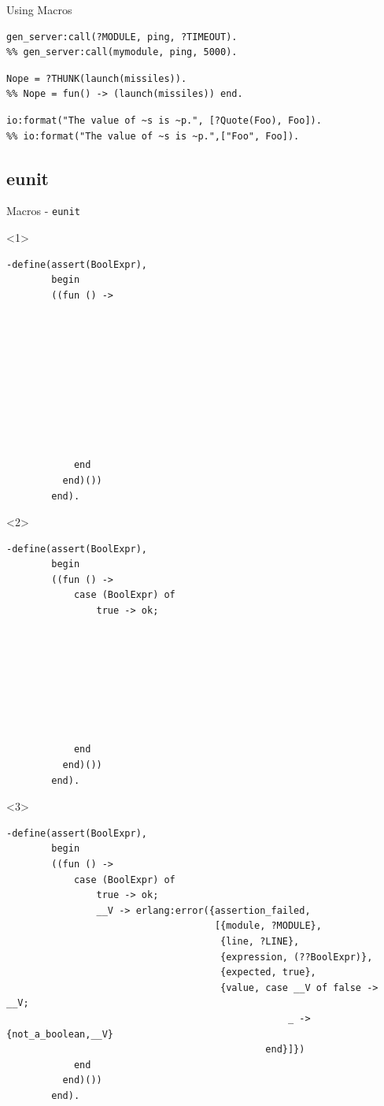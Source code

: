 \documentclass[c]{beamer}
\begin{document}
\begin{frame}[fragile]{Using Macros}
  \begin{lstlisting}
gen_server:call(?MODULE, ping, ?TIMEOUT).
%% gen_server:call(mymodule, ping, 5000).
  \end{lstlisting}
  \pause
  \begin{lstlisting}
Nope = ?THUNK(launch(missiles)).
%% Nope = fun() -> (launch(missiles)) end.
  \end{lstlisting}
  \pause
  \begin{lstlisting}
io:format("The value of ~s is ~p.", [?Quote(Foo), Foo]).
%% io:format("The value of ~s is ~p.",["Foo", Foo]).
  \end{lstlisting}
\end{frame}

\subsection{eunit}
\begin{frame}[fragile,t]{Macros - \texttt{eunit}}

  \begin{onlyenv}<1>
  \begin{lstlisting}
-define(assert(BoolExpr),
        begin
        ((fun () ->










            end
          end)())
        end).
  \end{lstlisting}
  \end{onlyenv}


  \begin{onlyenv}<2>
  \begin{lstlisting}
-define(assert(BoolExpr),
        begin
        ((fun () ->
            case (BoolExpr) of
                true -> ok;








            end
          end)())
        end).
  \end{lstlisting}
  \end{onlyenv}


  \begin{onlyenv}<3>
  \begin{lstlisting}
-define(assert(BoolExpr),
        begin
        ((fun () ->
            case (BoolExpr) of
                true -> ok;
                __V -> erlang:error({assertion_failed,
                                     [{module, ?MODULE},
                                      {line, ?LINE},
                                      {expression, (??BoolExpr)},
                                      {expected, true},
                                      {value, case __V of false -> __V;
                                                  _ -> {not_a_boolean,__V}
                                              end}]})
            end
          end)())
        end).
  \end{lstlisting}
  \end{onlyenv}
\end{frame}
\end{document}
